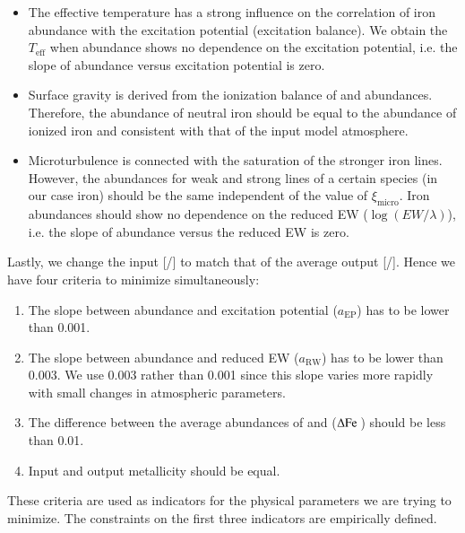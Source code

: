 \documentclass{aa}
\begin{document}
\begin{itemize}
    \item The effective temperature has a strong influence on the correlation
          of iron abundance with the excitation potential (excitation balance).
          We obtain the $T_\mathrm{eff}$ when  abundance shows no
          dependence on the excitation potential, i.e. the slope of abundance
          versus excitation potential is zero.
    \item Surface gravity is derived from the ionization balance of 
          and  abundances. Therefore, the abundance of neutral iron
          should be equal to the abundance of ionized iron and consistent with
          that of the input model atmosphere.
    \item Microturbulence is connected with the saturation of the stronger iron
          lines. However, the abundances for weak and strong lines of a certain
          species (in our case iron) should be the same independent of the value
          of $\xi_\mathrm{micro}$. Iron abundances should show no dependence on
          the reduced EW ($\log(EW/\lambda)$), i.e. the slope of abundance
          versus the reduced EW is zero.
\end{itemize}
Lastly, we change the input [/] to match that of the average
output [/]. Hence we have four criteria to minimize
simultaneously:

\begin{enumerate}
    \item The slope between abundance and excitation potential ($a_\mathrm{EP}$)
          has to be lower than 0.001.
    \item The slope between abundance and reduced EW ($a_\mathrm{RW}$) has to be
          lower than 0.003. We use 0.003 rather than 0.001 since this slope
          varies more rapidly with small changes in atmospheric parameters.
    \item The difference between the average abundances of  and
           ($\Delta\ion{Fe}{}$) should be less than 0.01.
    \item Input and output metallicity should be equal.
\end{enumerate}
These criteria are used as indicators for the physical parameters we are trying
to minimize. The constraints on the first three indicators are empirically
defined.
\end{document}
